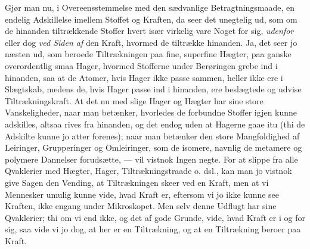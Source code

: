 \documentclass[12pt,a4paper]{book}
\begin{document}
Gjør man nu, i Overeensstemmelse med den sædvanlige
Betragtningsmaade, en endelig Adskillelse imellem Stoffet og
Kraften, da seer det unegtelig ud, som om de hinanden tiltrækkende
Stoffer hvert især virkelig vare Noget for sig, \emph{udenfor}
eller dog \emph{ved Siden af} den Kraft, hvormed de tiltrække
hinanden. Ja, det seer jo næsten ud, som beroede Tiltrækningen
paa fine, superfine Hægter, paa ganske overordentlig smaa
Hager, hvormed Stofferne under Berøringen grebe ind i
hinanden, saa at de Atomer, hvis Hager ikke passe sammen,
heller ikke ere i Slægtskab, medens de, hvis Hager passe ind
i hinanden, ere beslægtede og udvise Tiltrækningskraft. At
det nu med slige Hager og Hægter har sine store
Vanskeligheder, naar man betænker, hvorledes de forbundne Stoffer
igjen kunne adskilles, altsaa rives fra hinanden, og det endog
uden at Hagerne gaae itu (thi de Adskilte kunne jo atter
forenes); naar man betænker den store Mangfoldighed af
Leiringer, Grupperinger og Omleiringer, som de isomere,
navnlig de metamere og polymere Dannelser forudsætte, ---
vil vistnok Ingen negte. For at slippe fra alle Qvaklerier
med Hægter, Hager, Tiltrækningstraade o. dsl., kan man jo
vistnok give Sagen den Vending, at Tiltrækningen skeer ved
en Kraft, men at vi Mennesker umulig kunne vide, hvad
Kraft er, eftersom vi jo ikke kunne see Kraften, ikke
engang under Mikroskopet. Men selv denne Udflugt har sine
Qvaklerier; thi om vi end ikke, og det af gode Grunde, vide,
hvad Kraft er i og for sig, saa vide vi jo dog, at her er
en Tiltrækning, og at en Tiltrækning beroer paa Kraft.
\end{document}
